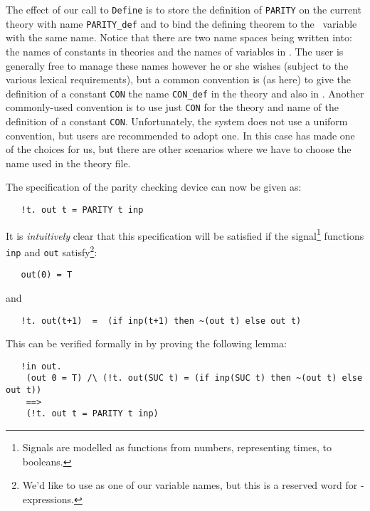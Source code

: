 \noindent

The effect of our call to {\small\verb|Define|} is to store the
definition of {\small\verb|PARITY|} on the current theory with name
{\small\verb|PARITY_def|} and to bind the defining theorem to the \ML\
variable with the same name.  Notice that there are two name spaces
being written into: the names of constants in theories and the names
of variables in \ML.  The user is generally free to manage these names
however he or she wishes (subject to the various lexical
requirements), but a common convention is (as here) to give the
definition of a constant {\small\tt CON} the name
{\small\verb|CON_def|} in the theory and also in \ML.  Another
commonly-used convention is to use just {\small\verb|CON|} for the
theory and \ML{} name of the definition of a constant
{\small\verb|CON|}.  Unfortunately, the \HOL{} system does not use a
uniform convention, but users are recommended to adopt one.  In this
case \ml{Define} has made one of the choices for us, but there are
other scenarios where we have to choose the name used in the theory
file.

The specification of the parity checking device can now be given as:

{\small\begin{verbatim}
   !t. out t = PARITY t inp
\end{verbatim}}

\noindent
It is {\it intuitively\/} clear that this specification will be
satisfied if the signal\footnote{Signals are modelled as functions
  from numbers, representing times, to booleans.}  functions
{\small\verb|inp|} and {\small\verb|out|} satisfy\footnote{We'd like
  to use \ml{in} as one of our variable names, but this is a reserved
  word for \ml{let}-expressions.}:

{\small\begin{verbatim}
   out(0) = T
\end{verbatim}}

\noindent and

{\small\begin{verbatim}
   !t. out(t+1)  =  (if inp(t+1) then ~(out t) else out t)
\end{verbatim}}

\noindent This can be verified formally in \HOL{} by proving the
following lemma:

{\small\begin{verbatim}
   !in out.
    (out 0 = T) /\ (!t. out(SUC t) = (if inp(SUC t) then ~(out t) else out t))
    ==>
    (!t. out t = PARITY t inp)
\end{verbatim}}

